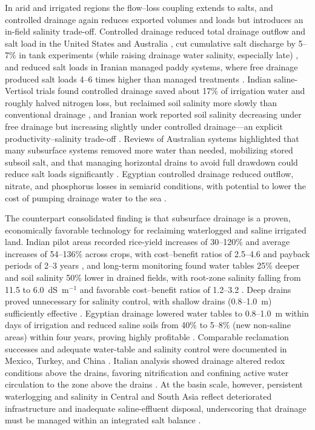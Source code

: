\documentclass[11pt]{article}
\begin{document}
In arid and irrigated regions the flow--loss coupling extends to salts, and
controlled drainage again reduces exported volumes and loads but introduces an
in-field salinity trade-off. Controlled drainage reduced total drainage outflow
and salt load in the United States and Australia \parencite{Ayars2006b}, cut
cumulative salt discharge by 5--7\% in tank experiments (while raising drainage
water salinity, especially late) \parencite{Zheng2025}, and reduced salt loads
in Iranian managed paddy systems, where free drainage produced salt loads 4--6
times higher than managed treatments \parencite{DarziNaftchali2018b}. Indian
saline-Vertisol trials found controlled drainage saved about 17\% of irrigation
water and roughly halved nitrogen loss, but reclaimed soil salinity more slowly
than conventional drainage \parencite{Karegoudar2019}, and Iranian work reported
soil salinity decreasing under free drainage but increasing slightly under
controlled drainage---an explicit productivity--salinity trade-off
\parencite{Jouni2018}. Reviews of Australian systems highlighted that many
subsurface systems removed more water than needed, mobilizing stored subsoil
salt, and that managing horizontal drains to avoid full drawdown could reduce
salt loads significantly \parencite{Christen2001}. Egyptian controlled drainage
reduced outflow, nitrate, and phosphorus losses in semiarid conditions, with
potential to lower the cost of pumping drainage water to the sea
\parencite{Wahba2001}.

The counterpart consolidated finding is that subsurface drainage is a proven,
economically favorable technology for reclaiming waterlogged and saline
irrigated land. Indian pilot areas recorded rice-yield increases of 30--120\%
and average increases of 54--136\% across crops, with cost--benefit ratios of
2.5--4.6 and payback periods of 2--3 years \parencite{Satyanarayana2007}, and
long-term monitoring found water tables 25\% deeper and soil salinity 50\% lower
in drained fields, with root-zone salinity falling from 11.5 to 6.0~dS~m$^{-1}$
and favorable cost--benefit ratios of 1.2--3.2 \parencite{Ritzema2008b}. Deep
drains proved unnecessary for salinity control, with shallow drains (0.8--1.0~m)
sufficiently effective \parencite{Ritzema2011,Satyanarayana2007}. Egyptian
drainage lowered water tables to 0.8--1.0~m within days of irrigation and
reduced saline soils from 40\% to 5--8\% (new non-saline areas) within four
years, proving highly profitable \parencite{Ali2001}. Comparable reclamation
successes and adequate water-table and salinity control were documented in
Mexico, Turkey, and China \parencite{MartínezBeltrán2007,Güngör2023,Shao2012,Yan2013b}.
Italian analysis showed drainage altered redox conditions above the drains,
favoring nitrification and confining active water circulation to the zone above
the drains \parencite{Mastrocicco2013}. At the basin scale, however, persistent
waterlogging and salinity in Central and South Asia reflect deteriorated
infrastructure and inadequate saline-effluent disposal, underscoring that
drainage must be managed within an integrated salt balance
\parencite{Dukhovny2007,Qureshi2008,Ritzema2016,SKAGGS1994}.
\end{document}

